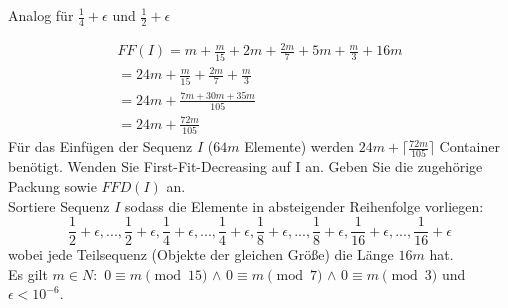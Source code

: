 \documentclass{article}
\begin{document}
Analog für $\frac{1}{4}+\epsilon$ und $\frac{1}{2}+\epsilon$

\begin{align*}
FF(I)=m+\frac{m}{15}+2m+\frac{2m}{7}+5m+\frac{m}{3}+16m\\
=24m+\frac{m}{15}+\frac{2m}{7}+\frac{m}{3}\\
=24m+\frac{7m+30m+35m}{105}\\
=24m+\frac{72m}{105}
\end{align*}
Für das Einfügen der Sequenz $I$ ($64m$ Elemente) werden $24m+\lceil\frac{72m}{105}\rceil$ Container benötigt.
\newpage
Wenden Sie First-Fit-Decreasing auf I an. Geben Sie die zugehörige Packung sowie $FFD(I)$ an.\\
Sortiere Sequenz $I$ sodass die Elemente in absteigender Reihenfolge vorliegen:\\
\begin{equation}
\frac{1}{2}+\epsilon,...,\frac{1}{2}+\epsilon,\frac{1}{4}+\epsilon,...,\frac{1}{4}+\epsilon,\frac{1}{8}+\epsilon,...,\frac{1}{8}+\epsilon,\frac{1}{16}+\epsilon,...,\frac{1}{16}+\epsilon
\end{equation}
wobei jede Teilsequenz (Objekte der gleichen Größe) die Länge $16m $ hat.\\ Es gilt $m\in N: $ $0 \equiv m \pmod{15}$ $\wedge$ $0 \equiv m \pmod{7}$ $\wedge$ $0 \equiv m \pmod{3}$ und $\epsilon < 10^{-6}$.
\end{document}
